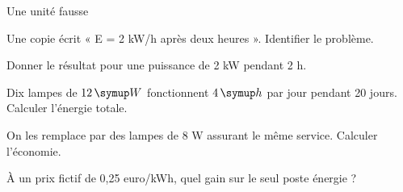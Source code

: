 \par\noindent\begin{minipage}{\linewidth}
\begin{exercice}[3]{Une unité fausse}
\begin{questions}
\item Une copie écrit « E = 2 kW/h après deux heures ». Identifier le problème.
\item Donner le résultat pour une puissance de 2 kW pendant 2 h.
\end{questions}
\end{exercice}
\end{minipage}
\label{defi-ex-17}
\begin{questions}
\item Dix lampes de $12\unite W$ fonctionnent $4\unite h$ par jour pendant 20 jours. Calculer l’énergie totale.
\item On les remplace par des lampes de 8 W assurant le même service. Calculer l’économie.
\item À un prix fictif de 0,25 euro/kWh, quel gain sur le seul poste énergie ?
\end{questions}
\pcGrille
